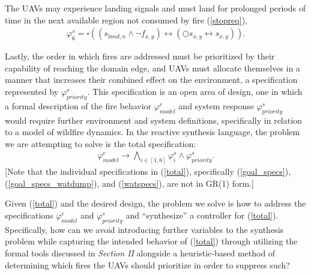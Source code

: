 \documentclass{ieeeaccess}
\newcommand{\always}{\square}
\newcommand{\next}{\bigcirc}
\begin{document}
The UAVs may experience landing signals and must land for prolonged periods of time in the next available region not consumed by fire (\ref{stopreq}),
\begin{equation}
\begin{aligned}
\varphi_{6}^{s} = \always ((s_{land,n} \land \lnot f_{x,y}) \leftrightarrow (\next s_{x,y} \leftrightarrow s_{x,y})).
\end{aligned}
\label{stopreq}
\end{equation}

Lastly, the order in which fires are addressed must be prioritized by their capability of reaching the domain edge, and UAVs must allocate themselves in a manner that increases their combined effect on the environment, a specification represented by $\varphi_{priority}^{s}$. This specification is an open area of design, one in which a formal description of the fire behavior $\varphi_{model}^{e}$ and system response $\varphi_{priority}^{s}$ would require further environment and system definitions, specifically in relation to a model of wildfire dynamics. In the reactive synthesis language, the problem we are attempting to solve is the total specification:
\begin{equation}
\begin{aligned}
\varphi_{model}^{e} \longrightarrow \bigwedge_{i \in [1,6]}\varphi_{i}^{s} \land \varphi_{priority}^s.
\end{aligned}
\label{total}
\end{equation}
[Note that the individual specifications in (\ref{total}), specifically (\ref{goal_specs}), (\ref{goal_specs_watdump}), and (\ref{watspecs}), are not in GR(1) form.]

Given (\ref{total}) and the desired design, the problem we solve is how to address the specifications $\varphi_{model}^{e}$ and $\varphi_{priority}^{s}$ and ``synthesize'' a controller for (\ref{total}). Specifically, how can we avoid introducing further variables to the synthesis problem while capturing the intended behavior of (\ref{total}) through utilizing the formal tools discussed in \textit{Section II} alongside a heuristic-based method of determining which fires the UAVs should prioritize in order to suppress such?
\end{document}
